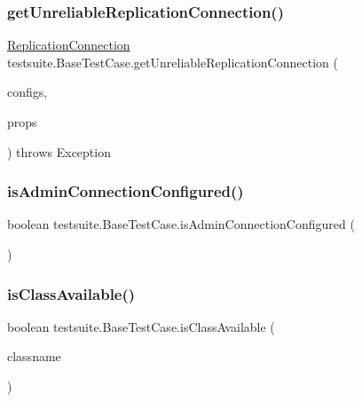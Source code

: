 \subsubsection{\texorpdfstring{get\+Unreliable\+Replication\+Connection()}{getUnreliableReplicationConnection()}\hspace{0.1cm}{\footnotesize\ttfamily [3/3]}}
{\footnotesize\ttfamily \mbox{\hyperlink{interfacecom_1_1mysql_1_1cj_1_1jdbc_1_1ha_1_1_replication_connection}{Replication\+Connection}} testsuite.\+Base\+Test\+Case.\+get\+Unreliable\+Replication\+Connection (\begin{DoxyParamCaption}\item[{Set$<$ Mock\+Connection\+Configuration $>$}]{configs,  }\item[{Properties}]{props }\end{DoxyParamCaption}) throws Exception\hspace{0.3cm}{\ttfamily [protected]}}

\mbox{\label{classtestsuite_1_1_base_test_case_a0c430c33af3faad8e9490abda2054142}} 
\subsubsection{\texorpdfstring{is\+Admin\+Connection\+Configured()}{isAdminConnectionConfigured()}}
{\footnotesize\ttfamily boolean testsuite.\+Base\+Test\+Case.\+is\+Admin\+Connection\+Configured (\begin{DoxyParamCaption}{ }\end{DoxyParamCaption})\hspace{0.3cm}{\ttfamily [protected]}}

\mbox{\label{classtestsuite_1_1_base_test_case_af67350d0499d7649ea352fddd70b0be2}} 
\subsubsection{\texorpdfstring{is\+Class\+Available()}{isClassAvailable()}}
{\footnotesize\ttfamily boolean testsuite.\+Base\+Test\+Case.\+is\+Class\+Available (\begin{DoxyParamCaption}\item[{String}]{classname }\end{DoxyParamCaption})\hspace{0.3cm}{\ttfamily [protected]}}

